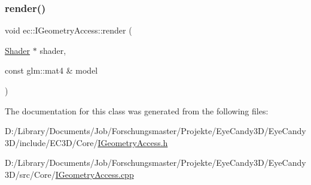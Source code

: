\subsubsection{\texorpdfstring{render()}{render()}}
{\footnotesize\ttfamily void ec\+::\+I\+Geometry\+Access\+::render (\begin{DoxyParamCaption}\item[{\mbox{\hyperlink{classec_1_1_shader}{Shader}} $\ast$}]{shader,  }\item[{const glm\+::mat4 \&}]{model }\end{DoxyParamCaption})\hspace{0.3cm}{\ttfamily [virtual]}}



The documentation for this class was generated from the following files\+:\begin{DoxyCompactItemize}
\item 
D\+:/\+Library/\+Documents/\+Job/\+Forschungsmaster/\+Projekte/\+Eye\+Candy3\+D/\+Eye\+Candy3\+D/include/\+E\+C3\+D/\+Core/\mbox{\hyperlink{_i_geometry_access_8h}{I\+Geometry\+Access.\+h}}\item 
D\+:/\+Library/\+Documents/\+Job/\+Forschungsmaster/\+Projekte/\+Eye\+Candy3\+D/\+Eye\+Candy3\+D/src/\+Core/\mbox{\hyperlink{_i_geometry_access_8cpp}{I\+Geometry\+Access.\+cpp}}\end{DoxyCompactItemize}
